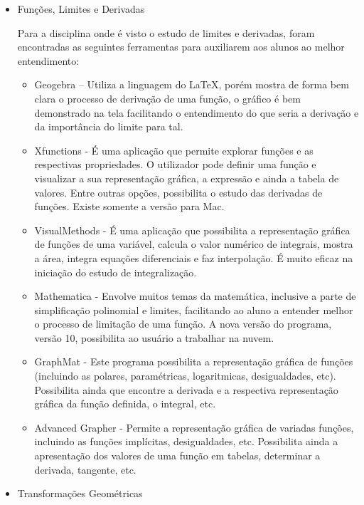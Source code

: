 \documentclass[12pt,a4paper]{article}
\begin{document}
\begin{itemize}
\begin{itemize}
\end{itemize}

\item Funções, Limites e Derivadas

Para a disciplina onde é visto o estudo de limites e derivadas, foram encontradas as seguintes ferramentas para auxiliarem aos alunos ao melhor entendimento:
\begin{itemize}
\item  Geogebra – Utiliza a linguagem do LaTeX, porém mostra de forma bem clara o processo de derivação de uma função, o gráfico é bem demonstrado na tela facilitando o entendimento do que seria a derivação e da importância do limite para tal.


\item Xfunctions - É uma aplicação que permite explorar funções e as respectivas propriedades. O utilizador pode definir uma função e visualizar a sua representação gráfica, a expressão e ainda a tabela de valores. Entre outras opções, possibilita o estudo das derivadas de funções. Existe somente a versão para Mac.

\item VisualMethods - É uma aplicação que possibilita a representação gráfica de funções de uma variável, calcula o valor numérico de integrais, mostra a área, integra equações diferenciais e faz interpolação. É muito eficaz na iniciação do estudo de integralização.

\item Mathematica - Envolve muitos temas da matemática, inclusive a parte de simplificação polinomial e limites, facilitando ao aluno a entender melhor o processo de limitação de uma função. A nova versão do programa, versão 10, possibilita ao usuário a trabalhar na nuvem.

\item GraphMat - Este programa possibilita a representação gráfica de funções (incluindo as polares, paramétricas, logaritmicas, desigualdades, etc). Possibilita ainda que encontre a derivada e a respectiva representação gráfica da função definida, o integral, etc.

\item Advanced Grapher - Permite a representação gráfica de variadas funções, incluindo as funções implícitas, desigualdades, etc. Possibilita ainda a apresentação dos valores de uma função em tabelas, determinar a derivada, tangente, etc.
\end{itemize}


\item Transformações Geométricas


\end{itemize}
\end{document}
